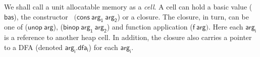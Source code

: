 \documentclass[preprint, 9pt]{sigplanconf}
\begin{document}

We shall call a  unit allocatable memory as a {\em  cell}.  A cell can
hold    a    basic    value    ($\mathsf{bas}$),    the    constructor
\CONS\ $(\mathsf{cons~  arg_1~arg_2}$) or a closure.   The closure, in
turn,    can    be    one   of    ($\mathsf{unop~arg}$),    ($\mathsf{
  binop~arg_1~arg_2}$)  and  function application  ($\mathsf{f~arg})$.
Here each $\mathsf{  arg_i}$ is a reference to another  heap cell.  In
addition, the closure also carries  a pointer to a DFA (denoted
$\mathsf{arg_i.dfa_i}$) for each $\mathsf{arg_i}$.
\end{document}
